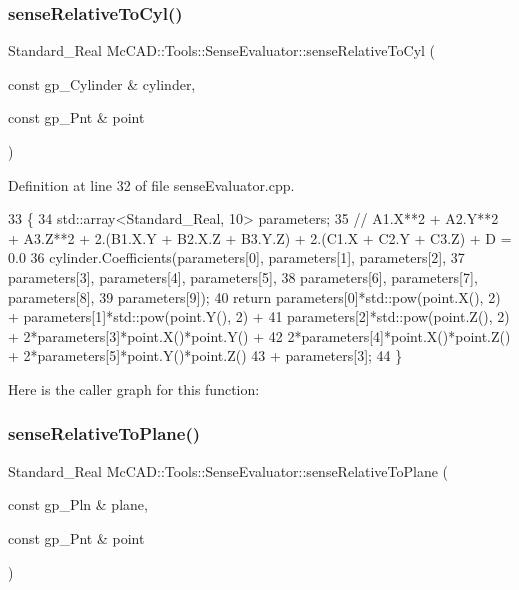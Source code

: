 \subsubsection{\texorpdfstring{sense\+Relative\+To\+Cyl()}{senseRelativeToCyl()}\hspace{0.1cm}{\footnotesize\ttfamily [2/2]}}
{\footnotesize\ttfamily Standard\+\_\+\+Real Mc\+C\+A\+D\+::\+Tools\+::\+Sense\+Evaluator\+::sense\+Relative\+To\+Cyl (\begin{DoxyParamCaption}\item[{const gp\+\_\+\+Cylinder \&}]{cylinder,  }\item[{const gp\+\_\+\+Pnt \&}]{point }\end{DoxyParamCaption})\hspace{0.3cm}{\ttfamily [private]}}



Definition at line 32 of file sense\+Evaluator.\+cpp.


\begin{DoxyCode}
33                                                                    \{
34     std::array<Standard\_Real, 10> parameters;
35     \textcolor{comment}{// A1.X**2 + A2.Y**2 + A3.Z**2 + 2.(B1.X.Y + B2.X.Z + B3.Y.Z) + 2.(C1.X + C2.Y + C3.Z) + D = 0.0}
36     cylinder.Coefficients(parameters[0], parameters[1], parameters[2],
37                           parameters[3], parameters[4], parameters[5],
38                           parameters[6], parameters[7], parameters[8],
39                           parameters[9]);
40     \textcolor{keywordflow}{return} parameters[0]*std::pow(point.X(), 2) + parameters[1]*std::pow(point.Y(), 2) +
41             parameters[2]*std::pow(point.Z(), 2) + 2*parameters[3]*point.X()*point.Y() +
42             2*parameters[4]*point.X()*point.Z() + 2*parameters[5]*point.Y()*point.Z()
43             + parameters[3];
44 \}
\end{DoxyCode}
Here is the caller graph for this function\+:
\mbox{\label{classMcCAD_1_1Tools_1_1SenseEvaluator_a1ca5a16c81eae36f9b6fdf4beef7d21e}} 
\subsubsection{\texorpdfstring{sense\+Relative\+To\+Plane()}{senseRelativeToPlane()}\hspace{0.1cm}{\footnotesize\ttfamily [1/2]}}
{\footnotesize\ttfamily Standard\+\_\+\+Real Mc\+C\+A\+D\+::\+Tools\+::\+Sense\+Evaluator\+::sense\+Relative\+To\+Plane (\begin{DoxyParamCaption}\item[{const gp\+\_\+\+Pln \&}]{plane,  }\item[{const gp\+\_\+\+Pnt \&}]{point }\end{DoxyParamCaption})\hspace{0.3cm}{\ttfamily [private]}}



